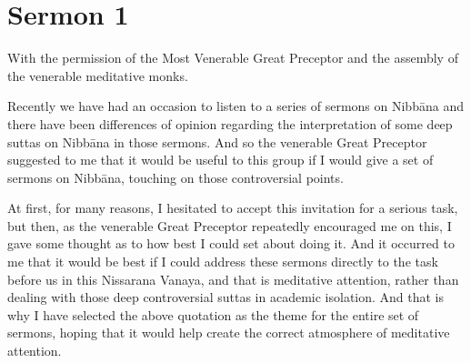 \chapter{Sermon 1}








\NibbanaOpeningQuote

With the permission of the Most Venerable Great Preceptor and the assembly of the venerable meditative monks.

Recently we have had an occasion to listen to a series of sermons on Nibbāna and there have been differences of opinion regarding the interpretation of some deep suttas on Nibbāna in those sermons. And so the venerable Great Preceptor suggested to me that it would be useful to this group if I would give a set of sermons on Nibbāna, touching on those controversial points.

At first, for many reasons, I hesitated to accept this invitation for a serious task, but then, as the venerable Great Preceptor repeatedly encouraged me on this, I gave some thought as to how best I could set about doing it. And it occurred to me that it would be best if I could address these sermons directly to the task before us in this Nissarana Vanaya, and that is meditative attention, rather than dealing with those deep controversial suttas in academic isolation. And that is why I have selected the above quotation as the theme for the entire set of sermons, hoping that it would help create the correct atmosphere of meditative attention.

